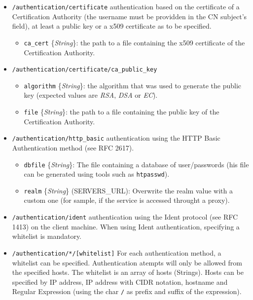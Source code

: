 \documentclass[a4wide,10pt,oneside]{book}
\newcommand{\ypath}[1]{\texttt{#1}}
\newcommand{\yfield}[2]{\texttt{#1} {\small\{{\emph{#2}}\}}:}
\newcommand{\yfieldd}[3]{\texttt{#1} {\small\{{\emph{#2}}\}} {\small(}#3{\small)}:}
\begin{document}
\begin{itemize}
  \item \ypath{/authentication/certificate} authentication based on the certificate of a Certification Authority (the username must be providden in the CN subject's field), at least a public key or a x509 certificate as to be specified.
  \begin{itemize}
    \item \yfield{ca\_cert}{String} the path to a file containing the x509 certificate of the Certification Authority.
  \end{itemize}
  \item \ypath{/authentication/certificate/ca\_public\_key}
  \begin{itemize}
    \item \yfield{algorithm}{String} the algorithm that was used to generate the public key (expected values are \emph{RSA}, \emph{DSA} or \emph{EC}).
    \item \yfield{file}{String} the path to a file containing the public key of the Certification Authority.
  \end{itemize}

  \item \ypath{/authentication/http\_basic} authentication using the HTTP Basic Authentication method (see RFC 2617).
  \begin{itemize}
    \item \yfield{dbfile}{String} The file containing a database of user/passwords (his file can be generated using tools such as \texttt{htpasswd}).
    \item \yfieldd{realm}{String}{SERVERS\_URL} Overwrite the realm value with a custom one (for sample, if the service is accessed throught a proxy).
  \end{itemize}
  \item \ypath{/authentication/ident} authentication using the Ident protocol (see RFC 1413) on the client machine. When using Ident authentication, specifying a whitelist is mandatory.
  \item \ypath{/authentication/*/[whitelist]} For each authentication method, a whitelist can be specified. Authentication atempts will only be allowed from the specified hosts. The whitelist is an array of hosts (Strings). Hosts can be specified by IP address, IP address with CIDR notation, hostname and Regular Expression (using the char \texttt{/} as prefix and suffix of the expression).


\end{itemize}
\end{document}
